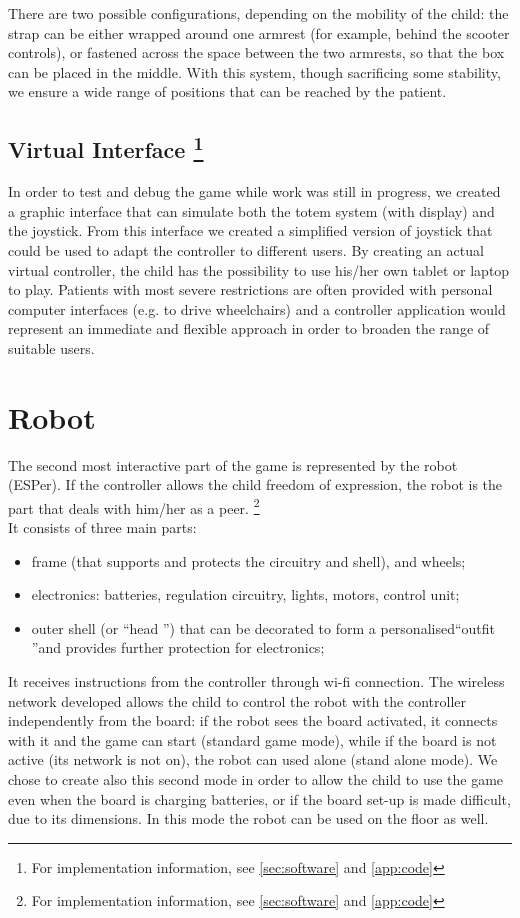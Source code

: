 \documentclass[a4paper,twoside]{book}
\begin{document}
There are two possible configurations, depending on the mobility of the child: the strap can be either wrapped around one armrest (for example, behind the scooter controls), or fastened across the space between the two armrests, so that the box can be placed in the  middle. With this system, though sacrificing some stability, we ensure a wide range of positions that can be reached by the patient.

\subsection[Virtual Interface]{Virtual Interface \footnote{For implementation information, see \autoref{sec:software} and \autoref{app:code}}}
In order to test and debug the game while work was still in progress, we created a graphic interface that can simulate both the totem system (with display) and the joystick. From this interface we created a simplified version of joystick that could be used to adapt the controller to different users. By creating an actual virtual controller, the child has the possibility to use his/her own tablet or laptop to play. Patients with most severe restrictions are often provided with personal computer interfaces (e.g. to drive wheelchairs) and a controller application would represent an immediate and flexible approach in order to broaden the range of suitable users.

\section{Robot}

The second most interactive part of the game is represented by the robot (ESPer). If the controller allows the child freedom of expression, the robot is the part that deals with him/her as a peer. 
\footnote{For implementation information, see \autoref{sec:software} and \autoref{app:code} }
\\
It consists of three main parts:
\begin{itemize}
\item frame (that supports and protects the circuitry and shell), and wheels;
\item electronics: batteries, regulation circuitry, lights, motors, control unit;
\item outer shell (or \textquotedblleft head \textquotedblright) that can be decorated to form a personalised\textquotedblleft outfit \textquotedblright and provides further protection for electronics;
\end{itemize}
It receives instructions from the controller through wi-fi connection. The wireless network developed allows the child to control the robot with the controller independently from the board: if the robot sees the board activated, it connects with it and the game can start (standard game mode), while if the board is not active (its network is not on), the robot can used alone (stand alone mode). We chose to create also this second mode in order to allow the child to use the game even when the board is charging batteries, or if the board set-up is made difficult, due to its dimensions. In this mode the robot can be used on the floor as well.
\end{document}
